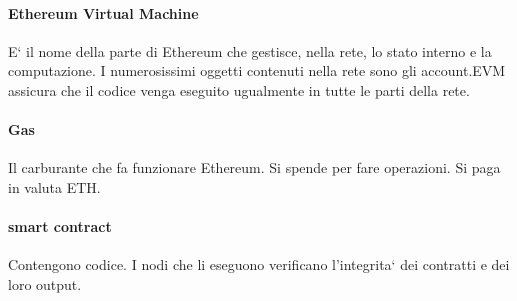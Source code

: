 \documentclass{book}
\begin{document}
		\paragraph{Ethereum Virtual Machine}
			E` il nome della parte di Ethereum che gestisce, nella rete, lo stato interno e la computazione. I numerosissimi oggetti contenuti nella rete sono gli account.\newline EVM assicura che il codice venga eseguito ugualmente in tutte le parti della rete.
		\paragraph{Gas}
			Il carburante che fa funzionare Ethereum. Si spende per fare operazioni. Si paga in valuta ETH.
		\paragraph{smart contract}
			Contengono codice. I nodi che li eseguono verificano l'integrita` dei contratti e dei loro output.
\end{document}
